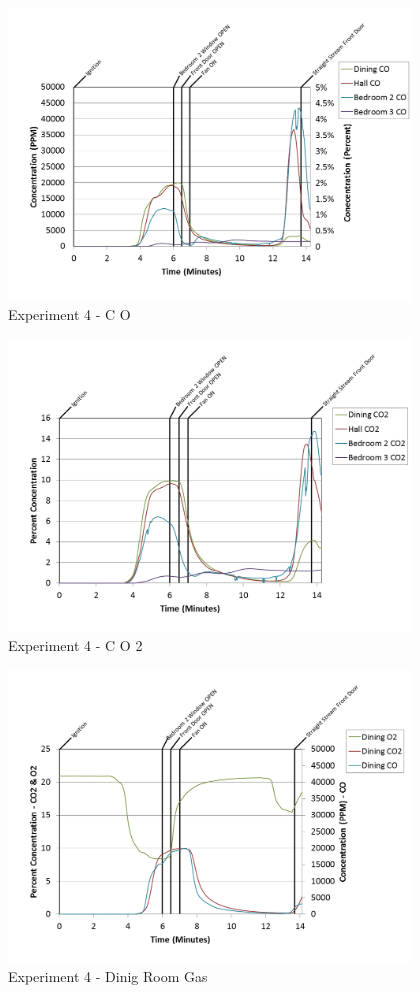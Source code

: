 \documentclass{article}
\begin{document}
\begin{appendices}
\begin{figure}[h!]
	\centering
	\includegraphics[height=3.05in]{0_Images/Results_Charts/Exp_4_Charts/CO.png}
	\caption{Experiment 4 - C O}
\end{figure}

\clearpage

\begin{figure}[h!]
	\centering
	\includegraphics[height=3.05in]{0_Images/Results_Charts/Exp_4_Charts/CO2.png}
	\caption{Experiment 4 - C O 2}
\end{figure}


\begin{figure}[h!]
	\centering
	\includegraphics[height=3.05in]{0_Images/Results_Charts/Exp_4_Charts/DinigRoomGas.png}
	\caption{Experiment 4 - Dinig Room Gas}
\end{figure}


\end{appendices}
\end{document}
